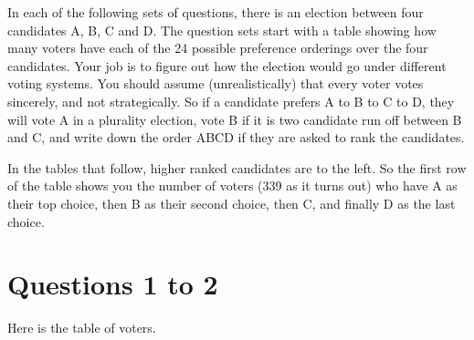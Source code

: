 
\def\mytitle{Voting Systems}
\def\myauthor{Assignment 6}
\def\mydate{Due March 9, 5pm}


In each of the following sets of questions, there is an election between four candidates A, B, C and D. The question sets start with a table showing how many voters have each of the 24 possible preference orderings over the four candidates. Your job is to figure out how the election would go under different voting systems. You should assume (unrealistically) that every voter votes sincerely, and not strategically. So if a candidate prefers A to B to C to D, they will vote A in a plurality election, vote B if it is two candidate run off between B and C, and write down the order ABCD if they are asked to rank the candidates.

In the tables that follow, higher ranked candidates are to the left. So the first row of the table shows you the number of voters (339 as it turns out) who have A as their top choice, then B as their second choice, then C, and finally D as the last choice.

\section{Questions 1 to 2}
\label{questions1to2}

Here is the table of voters.

